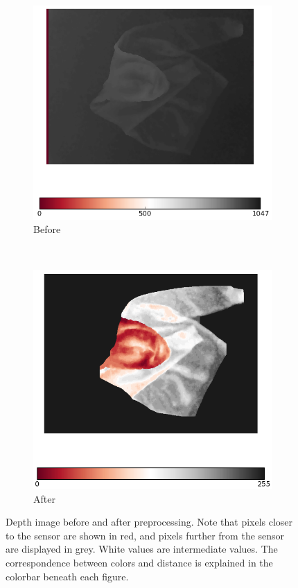 \begin{figure}[htbp]
	\centering
    \begin{subfigure}[l]{0.495\textwidth}
	    \centering
    	\includegraphics[width=\textwidth]
    	{figures/Depthmap-Raw-Depthmap-with-colorbar.png}
    	\caption{Before}
	\end{subfigure}
	~
    \begin{subfigure}[r]{0.485\textwidth}
	    \centering
    	\includegraphics[width=\textwidth]
    	{figures/Depthmap-Normalized-Depthmap-with-colorbar.png}
    	\caption{After}
    	\end{subfigure} 
    \caption[Depth image before and after preprocessing.]
    {Depth image before and after preprocessing. Note that pixels closer to the sensor are shown in red, and pixels further from the sensor are displayed in grey. White values are intermediate values. The correspondence between colors and distance is explained in the colorbar beneath each figure.} 
    \label{fig:depth_map_preprocessing}
\end{figure}



